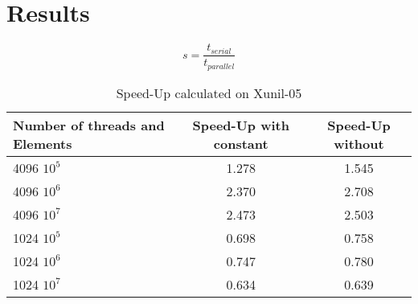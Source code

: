 \documentclass[12pt]{article}
\begin{document}
\pagebreak
\vspace{-0.6cm}
\section{Results}
\vspace{-0.4cm}


\begin{equation}
    s = \frac{t_{serial}}{t_{parallel}}\label{eq1}
\end{equation}


\begin{table}[H]
\centering
\begin{tabular}{@{}|l|c|c|}
\hline
Number of threads and Elements& Speed-Up with constant & Speed-Up without \\ \hline
4096 $10^5$  & 1.278  & 1.545 \\ \hline 
4096 $10^6$  & 2.370  & 2.708 \\ \hline 
4096 $10^7$  & 2.473  & 2.503 \\ \hline 
1024 $10^5$  & 0.698  & 0.758 \\ \hline
1024 $10^6$  & 0.747  & 0.780 \\ \hline
1024 $10^7$  & 0.634  & 0.639 \\ \hline
\end{tabular}
\caption{Speed-Up calculated on Xunil-05}
\end{table}
\end{document}
